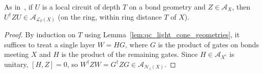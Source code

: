 \begin{lemma}
    \label{lem:qc_light_cone}
    \leanok
    As in~\cite[Theorem~1]{Malz2024Preparation}, if $U$ is a local circuit of depth $T$ on a bond geometry and $Z\in\mathcal A_X$, then $U^\dagger ZU\in\mathcal A_{\mathcal L_T(X)}$ (on the ring, within ring distance $T$ of $X$).
\end{lemma}
\begin{proof}
    \leanok
    By induction on $T$ using Lemma~\ref{lem:qc_light_cone_geometries}, it suffices to treat a single layer $W=HG$, where $G$ is the product of gates on bonds meeting $X$ and $H$ is the product of the remaining gates. Since $H\in\mathcal A_{X^c}$ is unitary, $[H,Z]=0$, so $W^\dagger ZW=G^\dagger ZG\in\mathcal A_{\mathcal N_1(X)}$.
\end{proof}


